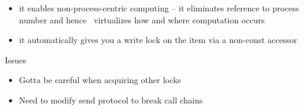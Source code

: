 \documentclass[letterpaper]{article}
\newcommand\liststyleLviii{%
\renewcommand\labelitemi{${\bullet}$}
\renewcommand\labelitemii{${\circ}$}
\renewcommand\labelitemiii{${\blacksquare}$}
\renewcommand\labelitemiv{${\bullet}$}
}
\newcommand\liststyleLix{%
\renewcommand\labelitemi{${\bullet}$}
\renewcommand\labelitemii{${\circ}$}
\renewcommand\labelitemiii{${\blacksquare}$}
\renewcommand\labelitemiv{${\bullet}$}
}
\begin{document}
\liststyleLviii
\begin{itemize}
\item it enables non-process-centric computing -- it eliminates reference to process number and hence \ virtualizes how
and where computation occurs
\item it automatically gives you a write lock on the item via a non-const accessor
\end{itemize}
Issues

\liststyleLix
\begin{itemize}
\item Gotta be careful when acquiring other locks
\item Need to modify send protocol to break call chains


\bigskip
\end{itemize}
\end{document}
